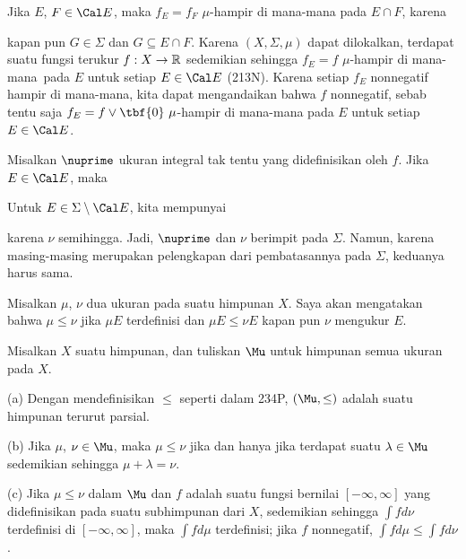 {\medskip

 Jika $E$, $F\in\Cal E$, maka
$f_E=f_F\,\,\mu$-hampir di mana-mana pada $E\cap F$, karena


\noindent kapan pun $G\in\Sigma$ dan $G\subseteq E\cap F$. Karena
$(X,\Sigma,\mu)$ dapat dilokalkan, terdapat suatu fungsi terukur
$f:X\to\Bbb R$ sedemikian sehingga $f_E=f\,\,\mu$-hampir di mana-mana\ 
pada $E$ untuk setiap $E\in\Cal E$ (213N). Karena setiap $f_E$
nonnegatif hampir di mana-mana, kita dapat mengandaikan bahwa $f$
nonnegatif, sebab tentu saja $f_E=f\vee\tbf{0}\,\,\mu$-hampir di
mana-mana pada $E$ untuk setiap $E\in\Cal E$.

\medskip

 Misalkan $\nuprime$ ukuran integral tak tentu yang
didefinisikan oleh $f$. Jika $E\in\Cal E$, maka

\noindent Untuk $E\in\Sigma\setminus\Cal E$, kita mempunyai


\noindent karena $\nu$ semihingga. Jadi, $\nuprime$ dan $\nu$ berimpit
pada $\Sigma$. Namun, karena masing-masing merupakan pelengkapan dari
pembatasannya pada $\Sigma$, keduanya harus sama.
}%

Misalkan $\mu$, $\nu$ dua ukuran pada suatu himpunan $X$.
Saya akan mengatakan bahwa $\mu\le\nu$ jika $\mu E$ terdefinisi dan
$\mu E\le\nu E$ kapan pun $\nu$ mengukur $E$.

Misalkan $X$ suatu himpunan, dan tuliskan $\Mu$ untuk himpunan semua
ukuran pada $X$.

(a) Dengan mendefinisikan $\le$ seperti dalam 234P, $(\Mu,\le)$ adalah
suatu himpunan terurut parsial.

(b) Jika $\mu$, $\nu\in\Mu$, maka $\mu\le\nu$ jika dan hanya jika terdapat
suatu $\lambda\in\Mu$ sedemikian sehingga $\mu+\lambda=\nu$.

(c) Jika $\mu\le\nu$ dalam $\Mu$ dan $f$ adalah suatu fungsi bernilai
$[-\infty,\infty]$ yang didefinisikan pada suatu subhimpunan dari $X$,
sedemikian sehingga $\int fd\nu$ terdefinisi di $[-\infty,\infty]$, maka
$\int fd\mu$ terdefinisi; jika $f$ nonnegatif,
$\int fd\mu\le\int fd\nu$.

